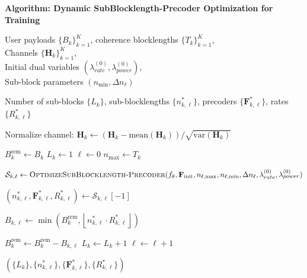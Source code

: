 \documentclass[a4paper, 12pt, onecolumn, journal, twoside, draftclsnofoot]{IEEEtran}
\begin{document}
\noindent\textbf{Algorithm: Dynamic SubBlocklength-Precoder Optimization for Training}
\begin{algorithmic}[1]

\Require
User payloads $\{B_k\}_{k=1}^K$, coherence blocklengths $\{T_k\}_{k=1}^K$,\\
Channels $\{\mathbf{H}_k\}_{k=1}^K$,\\
Initial dual variables $(\lambda_{rate}^{(0)}, \lambda_{power}^{(0)})$,\\
Sub-block parameters $(n_{\min}, \Delta n_\ell)$

\Ensure
Number of sub-blocks $\{L_k\}$, sub-blocklengths $\{n_{k,\ell}^*\}$, precoders $\{\mathbf{F}_{k,\ell}^*\}$, rates $\{R_{k,\ell}^*\}$

 

    \State Normalize channel:
    $\mathbf{H}_k \gets (\mathbf{H}_k - \mathrm{mean}(\mathbf{H}_k)) / \sqrt{\mathrm{var}(\mathbf{H}_k)}$

    \State $B_k^{\mathrm{rem}} \gets B_k$
    \State $L_k \gets 1$
    \State $\ell \gets 0$
    \State $n_{\max} \gets T_k$

        \State
        $\mathcal{S}_{k,\ell}
        \gets
        \textsc{OptimizeSubBlocklength-Precoder}(
        f_\theta,
        \mathbf{F}_{\mathrm{init}},
        n_{\ell,\max},
        n_{\ell,\min},
        \Delta n_\ell,
        \lambda_{rate}^{(0)},
        \lambda_{power}^{(0)})$

        \State
        $(n_{k,\ell}^*, \mathbf{F}_{k,\ell}^*, R_{k,\ell}^*)
        \gets \mathcal{S}_{k,\ell}[-1]$ 
        

        \State
        $B_{k,\ell}
        \gets
        \min\!\left(
			B_k^{\mathrm{rem}},
			\left\lfloor n_{k,\ell}^* \cdot R_{k,\ell}^* \right\rfloor
			\right)$
			
        \State $B_k^{\mathrm{rem}} \gets B_k^{\mathrm{rem}} - B_{k,\ell}$
			\State $L_k \gets L_k + 1$
			\State $\ell \gets \ell + 1$
		\EndIf
    \EndWhile

\EndFor

\State \Return
$(\{L_k\}, \{n_{k,\ell}^*\}, \{\mathbf{F}_{k,\ell}^*\}, \{R_{k,\ell}^*\})$

\end{algorithmic}
\end{document}
